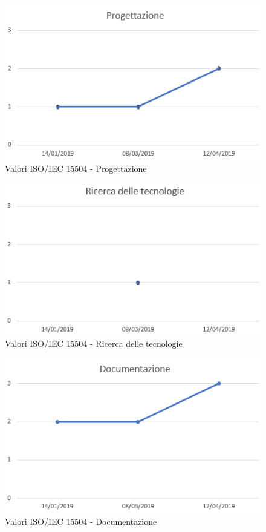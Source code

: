 \begin{figure}[H]
	\centering
	\includegraphics[scale=1]{images/resoconto/Progettazione.png}
	\caption{Valori ISO/IEC 15504 - Progettazione}	
\end{figure}


\begin{figure}[H]
	\centering
	\includegraphics[scale=1]{images/resoconto/Ricerca.png}
	\caption{Valori ISO/IEC 15504 - Ricerca delle tecnologie}	
\end{figure}


\begin{figure}[H]
	\centering
	\includegraphics[scale=1]{images/resoconto/Documentazione.png}
	\caption{Valori ISO/IEC 15504 - Documentazione}	
\end{figure}


